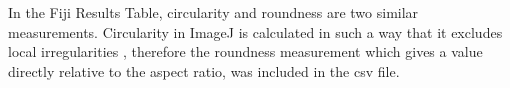 \documentclass[paper=A4,bibliography=totocnumbered]{scrartcl}
\begin{document}
In  the Fiji Results Table, circularity and roundness are two similar measurements. Circularity in ImageJ is calculated in such a way that it excludes local irregularities 
, therefore the roundness measurement which gives a value directly relative to the aspect ratio, was included in the csv file.



\renewcommand\bibname{References} %

\end{document}
